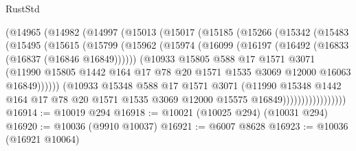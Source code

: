\begin{lexlean}{RustStd}
\begin{coremodule}
{{              (@14965
                (@14982
                  (@14997
                    (@15013
                      (@15017
                        (@15185
                          (@15266
                            (@15342
                              (@15483
                                (@15495
                                  (@15615
                                    (@15799
                                      (@15962
                                        (@15974
                                          (@16099
                                            (@16197 (@16492 (@16833 (@16837 (@16846 @16849))))))
                                          (@10933
                                            @15805
                                            @588
                                            @17
                                            @1571
                                            @3071
                                            (@11990
                                              @15805
                                              @1442
                                              @164
                                              @17
                                              @78
                                              @20
                                              @1571
                                              @1535
                                              @3069
                                              @12000
                                              @16063
                                              @16849))))))
                                  (@10933
                                    @15348
                                    @588
                                    @17
                                    @1571
                                    @3071
                                    (@11990
                                      @15348
                                      @1442
                                      @164
                                      @17
                                      @78
                                      @20
                                      @1571
                                      @1535
                                      @3069
                                      @12000
                                      @15575
                                      @16849)))))))))))))))))
@16914 := @10019 @294
@16918 := @10021 (@10025 @294) (@10031 @294)
@16920 := @10036 (@9910 @10037)
@16921 := @6007 @8628
@16923 := @10036 (@16921 @10064)
}}
\end{coremodule}
\end{lexlean}
